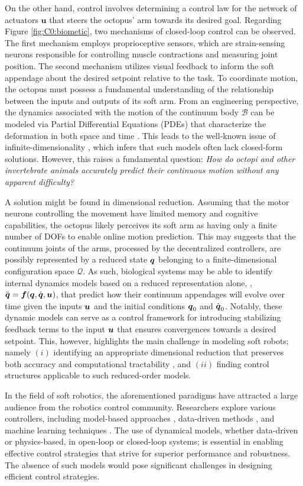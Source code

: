 On the other hand, control involves determining a control law for the network of actuators $\textbf{u}$ that steers the octopus' arm towards its desired goal. Regarding Figure \ref{fig:C0:biometic}, two mechanisms of closed-loop control can be observed. The first mechanism employs proprioceptive sensors, which are strain-sensing neurons responsible for controlling muscle contractions and measuring joint position. The second mechanism utilizes visual feedback to inform the soft appendage about the desired setpoint relative to the task. To coordinate motion, the octopus must possess a fundamental understanding of the relationship between the inputs and outputs of its soft arm. From an engineering perspective, the dynamics associated with the motion of the continuum body $\mathcal{B}$ can be modeled via Partial Differential Equations (PDEs) that characterize the deformation in both space and time \cite{Armanini2023,DellaSantina2021,Rus2015}. This leads to the well-known issue of infinite-dimensionality \cite{DellaSantina2020,Holzapfel2002,Mochiyama1992}, which infers that such models often lack closed-form solutions. However, this raises a fundamental question: \emph{How do octopi and other invertebrate animals accurately predict their continuous motion without any apparent difficulty?} 

A solution might be found in dimensional reduction. Assuming that the motor neurons controlling the movement have limited memory and cognitive capabilities, the octopus likely perceives its soft arm as having only a finite number of DOFs to enable online motion prediction. This may suggests that the continuum joints of the arms, processed by the decentralized controllers, are possibly represented by a reduced state ${\boldsymbol{q}}$ belonging to a finite-dimensional configuration space $\mathcal{Q}$. As such, biological systems may be able to identify internal dynamics models based on a reduced representation alone, \eg, ${\ddot{\boldsymbol{q}}} = {\boldsymbol{f}}({\boldsymbol{q}},{\dot{\boldsymbol{q}}},{\boldsymbol{u}})$, that predict how their continuum appendages will evolve over time given the inputs ${\boldsymbol{u}}$ and the initial conditions ${\boldsymbol{q}}_0$ and ${\dot{\boldsymbol{q}}}_0$. Notably, these dynamic models can serve as a control framework for introducing stabilizing feedback terms to the input ${\boldsymbol{u}}$ that ensures convergences towards a desired setpoint. This, however, highlights the main challenge in modeling soft robots; namely $(i)$ identifying an appropriate dimensional reduction that preserves both accuracy and computational tractability \cite{DellaSantina2021}, and $(ii)$ finding control structures applicable to such reduced-order models.

In the field of soft robotics, the aforementioned paradigms have attracted a large audience from the robotics control community. Researchers explore various controllers, including model-based approaches \cite{Armanini2023,DellaSantina2021,Milana2021,Franco2020}, data-driven methods \cite{Bruder2019,Alora2022}, and machine learning techniques \cite{Thuruthel2017Oct,Thuruthel2018Nov,Kim2021Feb,Schegg2022}. The use of dynamical models, whether data-driven or physics-based, in open-loop or closed-loop systems; is essential in enabling effective control strategies that strive for superior performance and robustness. The absence of such models would pose significant challenges in designing efficient control strategies.
